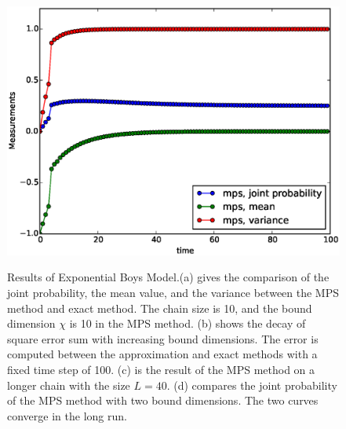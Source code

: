 \documentclass[english]{article}
\begin{document}
\begin{figure}[H]
{\includegraphics[scale=0.4]{Result_Fig/Exponential_MPS_t100_s40_bd10.eps}}\hfill
{}
  \caption{Results of Exponential Boys Model.(a) gives the comparison of the joint probability, the mean value, and the variance between the MPS method and exact method. The chain size is 10, and the bound dimension $\chi$ is 10 in the MPS method. (b) shows the decay of square error sum with increasing bound dimensions. The error is computed between the approximation and exact methods with a fixed time step of 100. (c) is the result of the MPS method on a longer chain with the size $L=40$. (d) compares the joint probability of the MPS method with two bound dimensions. The two curves converge in the long run.}
  \label{fig:Exponential_result}
\end{figure}
\end{document}
